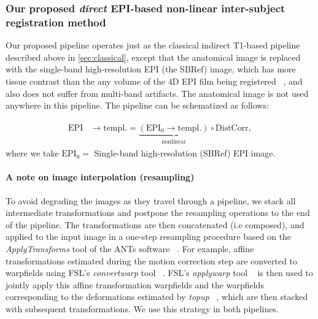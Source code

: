 
\subsubsection{Our proposed \textit{direct} EPI-based non-linear  inter-subject
  registration method}
\label{sec:proposed}
Our proposed pipeline operates just as the
classical indirect T1-based pipeline described above in
\ref{sec:classical}, except that the anatomical image is replaced with
the single-band high-resolution EPI (the SBRef) image, which has more tissue contrast than the any volume of the 4D EPI film being registered
~\citep{glasser2013}, and also does not suffer from multi-band artifacts. The anatomical image is not used anywhere in
this pipeline.  The pipeline can be schematized as follows:

\begin{eqnarray}
  \begin{split}
    \text{EPI} &\rightarrow \text{templ.}
    = \underbrace{(\text{EPI}_0 \rightarrow \text{templ.})}_{\text{nonlinear}} \circ  \text{DistCorr},
    \label{eq:dcsbref_pl}
    \end{split}
\end{eqnarray}
where we take $\text{EPI}_0 = $ Single-band high-resolution (SBRef) EPI image.

\paragraph{A note on image interpolation (resampling)}
To avoid degrading the images as they travel through a pipeline, we
stack all intermediate transformations and postpone the resampling
operations to the end of the pipeline. The transformations are then
concatenated (i.e composed), and applied to the input image in a
one-step resampling procedure based on the \textit{ApplyTransforms}
tool of the ANTs software ~\citep{avants2008,avants2009advanced}. For
example,  affine transformations estimated during the
motion correction step are converted to warpfields using FSL's
\textit{convertwarp} tool ~\citep{smith2004}. FSL's \textit{applywarp}
tool ~\citep{smith2004} is then used to jointly apply this affine
transformation warpfields and the warpfields corresponding to the
deformations estimated by \textit{topup} ~\citep{smith2004}, which
are then stacked with subsequent transformations. We use this strategy in both pipelines.

